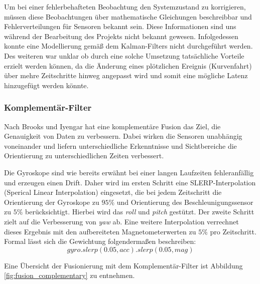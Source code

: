Um bei einer fehlerbehafteten Beobachtung den Systemzustand zu korrigieren, müssen diese Beobachtungen über mathematische Gleichungen beschreibbar und Fehlerverteilungen für Sensoren bekannt sein. Diese Informationen sind uns während der Bearbeitung des Projekts nicht bekannt gewesen.
Infolgedessen konnte eine Modellierung gemäß dem Kalman-Filters nicht durchgeführt werden. 
Des weiteren war unklar ob durch eine solche Umsetzung tatsächliche Vorteile erzielt werden können, da die Änderung eines plötzlichen Ereignis (Kurvenfahrt) über mehre Zeitschritte hinweg angepasst wird und somit eine mögliche Latenz hinzugefügt werden könnte.

\subsubsection{Komplementär-Filter}
Nach Brooks und Iyengar \cite{}  hat eine komplementäre Fusion das Ziel, die Genauigkeit von Daten zu verbessern. 
Dabei wirken die Sensoren unabhängig voneinander und liefern unterschiedliche Erkenntnisse und Sichtbereiche die Orientierung zu unterschiedlichen Zeiten verbessert.

Die Gyroskope sind wie bereits erwähnt bei einer langen Laufzeiten fehleranfällig und erzeugen einen Drift. 
Daher wird im ersten Schritt eine SLERP-Interpolation (Sperical Linear Interpolation) eingesetzt, die bei jedem Zeitschritt die Orientierung der Gyroskope zu $95\%$ und Orientierung des Beschleunigungssensor zu $5\%$ berücksichtigt. Hierbei wird das \emph{roll} und \emph{pitch} gestützt. Der zweite Schritt zielt auf die Verbesserung von \emph{yaw} ab. Eine weitere Interpolation verrechnet dieses Ergebnis mit den aufbereiteten Magnetometerwerten zu $5\%$ pro Zeitschritt. Formal lässt sich die Gewichtung folgendermaßen beschreiben:
\begin{equation}
    gyro.slerp(0.05, acc).slerp(0.05, mag)
\end{equation}


Eine Übersicht der Fusionierung mit dem Komplementär-Filter ist Abbildung \ref{fig:fusion_complementary} zu entnehmen.

